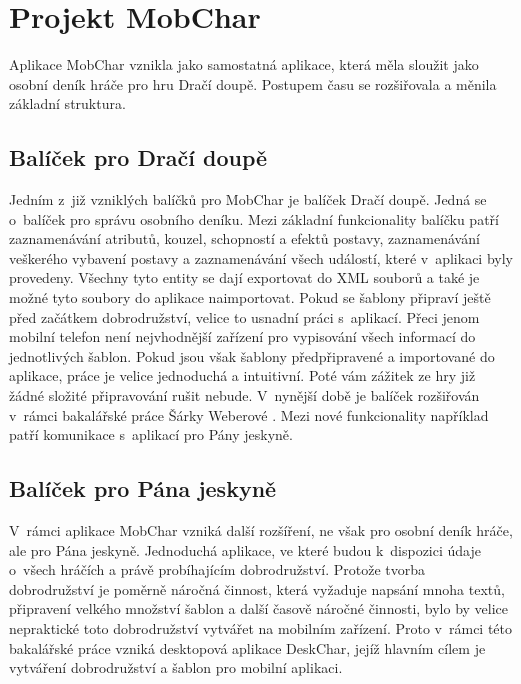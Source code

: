 \documentclass[thesis=B,czech]{resources/FITthesis}[2012/06/26]
\begin{document}
\section{Projekt MobChar}	
Aplikace MobChar vznikla jako samostatná aplikace, která měla sloužit jako osobní deník hráče pro hru Dračí doupě. Postupem času se rozšiřovala a měnila základní struktura. 

\subsection{Balíček pro Dračí doupě}
Jedním z~již vzniklých balíčků pro MobChar je balíček Dračí doupě. Jedná se o~balíček pro správu  osobního deníku. Mezi základní funkcionality balíčku patří zaznamenávání atributů, kouzel, schopností a efektů postavy, zaznamenávání veškerého vybavení postavy a zaznamenávání všech událostí, které v~aplikaci byly provedeny. Všechny tyto entity se dají exportovat do XML souborů a také je možné tyto soubory do aplikace naimportovat. Pokud se šablony připraví ještě před začátkem dobrodružství, velice to usnadní práci s~aplikací. Přeci jenom mobilní telefon není nejvhodnější zařízení pro vypisování všech informací do jednotlivých šablon. Pokud jsou však šablony předpřipravené a importované do aplikace, práce je velice jednoduchá a intuitivní. Poté vám zážitek ze hry již žádné složité připravování rušit nebude. V~nynější době je balíček rozšiřován v~rámci bakalářské práce Šárky Weberové \cite{Weberova_2017}. Mezi nové funkcionality například patří komunikace s~aplikací pro Pány jeskyně.

\subsection{Balíček pro Pána jeskyně}
V~rámci aplikace MobChar vzniká další rozšíření, ne však pro osobní deník hráče, ale pro Pána jeskyně. Jednoduchá aplikace, ve které budou k~dispozici údaje o~všech hráčích a právě probíhajícím dobrodružství. Protože tvorba dobrodružství je poměrně náročná činnost, která vyžaduje napsání mnoha textů, připravení velkého množství šablon a další časově náročné činnosti, bylo by velice nepraktické toto dobrodružství vytvářet na mobilním zařízení. Proto v~rámci této bakalářské práce vzniká desktopová aplikace DeskChar, jejíž hlavním cílem je vytváření dobrodružství a šablon pro mobilní aplikaci.
\end{document}
